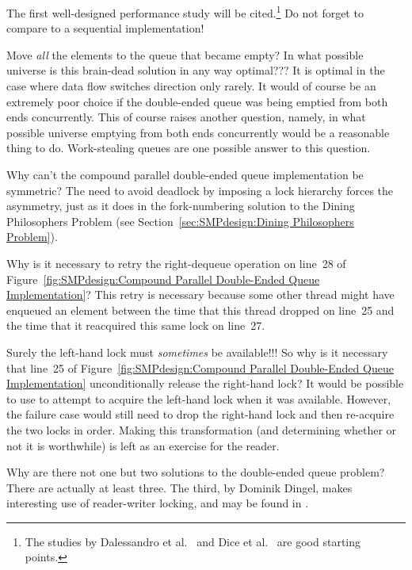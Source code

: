 \begin{enumerate}
	The first well-designed performance study will be cited.\footnote{
		The studies by Dalessandro
		et al.~\cite{LukeDalessandro:2011:ASPLOS:HybridNOrecSTM:deque}
		and Dice et al.~\cite{DavidDice:2010:SCA:HTM:deque} are
		good starting points.}
	Do not forget to compare to a sequential implementation!

\QuickQ{}
	Move \emph{all} the elements to the queue that became empty?
	In what possible universe is this brain-dead solution in any
	way optimal???
\QuickA{}
	It is optimal in the case where data flow switches direction only
	rarely.
	It would of course be an extremely poor choice if the double-ended
	queue was being emptied from both ends concurrently.
	This of course raises another question, namely, in what possible
	universe emptying from both ends concurrently would be a reasonable
	thing to do.
	Work-stealing queues are one possible answer to this question.

\QuickQ{}
	Why can't the compound parallel double-ended queue
	implementation be symmetric?
\QuickA{}
	The need to avoid deadlock by imposing a lock hierarchy
	forces the asymmetry, just as it does in the fork-numbering
	solution to the Dining Philosophers Problem
	(see Section~\ref{sec:SMPdesign:Dining Philosophers Problem}).

\QuickQ{}
	Why is it necessary to retry the right-dequeue operation
	on line~28 of
	Figure~\ref{fig:SMPdesign:Compound Parallel Double-Ended Queue Implementation}?
\QuickA{}
	This retry is necessary because some other thread might have
	enqueued an element between the time that this thread dropped
	 on line~25 and the time that it reacquired this
	same lock on line~27.

\QuickQ{}
	Surely the left-hand lock must \emph{sometimes} be available!!!
	So why is it necessary that line~25 of
	Figure~\ref{fig:SMPdesign:Compound Parallel Double-Ended Queue Implementation}
	unconditionally release the right-hand lock?
\QuickA{}
	It would be possible to use  to attempt
	to acquire the left-hand lock when it was available.
	However, the failure case would still need to drop the
	right-hand lock and then re-acquire the two locks in order.
	Making this transformation (and determining whether or not
	it is worthwhile) is left as an exercise for the reader.

\QuickQ{}
	Why are there not one but two solutions to the double-ended queue
	problem?
\QuickA{}
	There are actually at least three.
	The third, by Dominik Dingel, makes interesting use of
	reader-writer locking, and may be found in .


\end{enumerate}
